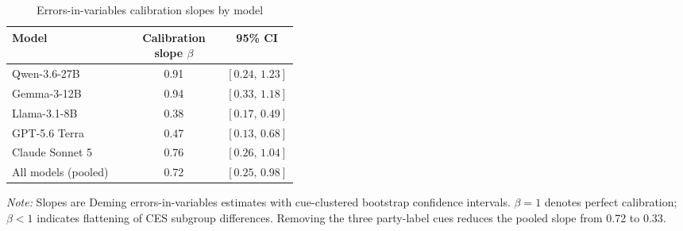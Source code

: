 \begin{table}[H]
\centering
\caption{Errors-in-variables calibration slopes by model}
\label{tab:calibration_slopes}
\begin{tabular}{p{0.42\linewidth} cc}
\toprule
\textbf{Model} & \textbf{Calibration slope $\beta$} & \textbf{95\% CI} \\
\midrule
Qwen-3.6-27B    & 0.91 & $[0.24,\, 1.23]$ \\
Gemma-3-12B     & 0.94 & $[0.33,\, 1.18]$ \\
Llama-3.1-8B    & 0.38 & $[0.17,\, 0.49]$ \\
GPT-5.6 Terra   & 0.47 & $[0.13,\, 0.68]$ \\
Claude Sonnet 5 & 0.76 & $[0.26,\, 1.04]$ \\
\midrule
All models (pooled) & 0.72 & $[0.25,\, 0.98]$ \\
\bottomrule
\end{tabular}

\vspace{3pt}
\begin{minipage}{0.90\linewidth}
\footnotesize\textit{Note:} Slopes are Deming errors-in-variables estimates with
cue-clustered bootstrap confidence intervals. $\beta=1$ denotes perfect
calibration; $\beta<1$ indicates flattening of CES subgroup differences. Removing
the three party-label cues reduces the pooled slope from 0.72 to 0.33.
\end{minipage}
\end{table}
